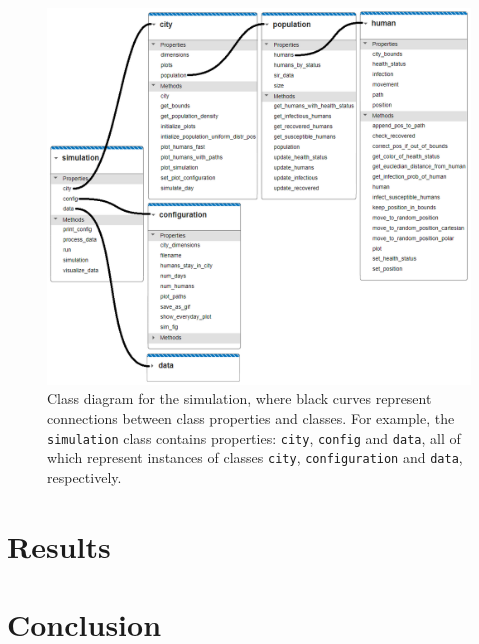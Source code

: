 \documentclass[a4paper]{article}
\newcommand{\code}{\texttt}
\begin{document}
\begin{figure}[h!]
	\centering
	\includegraphics[scale=0.65]{images/simulation_class_diagram.png}
	\caption{Class diagram for the simulation, where black curves represent connections between class properties and classes. For example, the \code{simulation} class contains properties: \code{city}, \code{config} and \code{data}, all of which represent instances of classes \code{city}, \code{configuration} and \code{data}, respectively.}
	\label{figure:simulation-class-diagram}
\end{figure}




\section{Results}\label{section:results}




\section{Conclusion}\label{section:conclusion}





 
\end{document}
